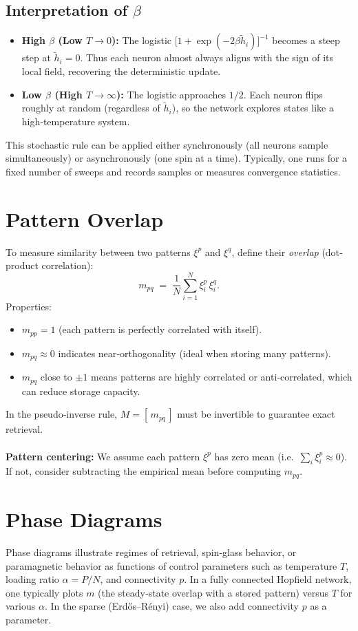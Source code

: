 \documentclass{article}
\begin{document}
\subsection{Interpretation of $\beta$}
\begin{itemize}
    \item \textbf{High $\beta$ (Low $T\to 0$):}  The logistic $\bigl[1+\exp(-2\beta\tilde{h}_i)\bigr]^{-1}$ becomes a steep step at $\tilde{h}_i=0$.  Thus each neuron almost always aligns with the sign of its local field, recovering the deterministic update.
    \item \textbf{Low $\beta$ (High $T\to\infty$):}  The logistic approaches $1/2$.  Each neuron flips roughly at random (regardless of $\tilde{h}_i$), so the network explores states like a high‐temperature system.
\end{itemize}
This stochastic rule can be applied either synchronously (all neurons sample simultaneously) or asynchronously (one spin at a time).  Typically, one runs for a fixed number of sweeps and records samples or measures convergence statistics.

\section{Pattern Overlap}
To measure similarity between two patterns $\xi^p$ and $\xi^q$, define their \emph{overlap} (dot‐product correlation):
\[
m_{pq}
\;=\;
\frac{1}{N}\sum_{i=1}^{N} \xi_i^p \,\xi_i^q.
\]
Properties:
\begin{itemize}
    \item $m_{pp} = 1$ (each pattern is perfectly correlated with itself).
    \item $m_{pq}\approx 0$ indicates near‐orthogonality (ideal when storing many patterns).
    \item $m_{pq}$ close to $\pm 1$ means patterns are highly correlated or anti‐correlated, which can reduce storage capacity.
\end{itemize}
In the pseudo‐inverse rule, $M = [\,m_{pq}\,]$ must be invertible to guarantee exact retrieval.
\\\\
\textbf{Pattern centering:}  We assume each pattern $\xi^p$ has zero mean (i.e.\ $\sum_i \xi_i^p \approx 0$).  If not, consider subtracting the empirical mean before computing $m_{pq}$.  
\section{Phase Diagrams}
Phase diagrams illustrate regimes of retrieval, spin‐glass behavior, or paramagnetic behavior as functions of control parameters such as temperature $T$, loading ratio $\alpha = P/N$, and connectivity $p$.  In a fully connected Hopfield network, one typically plots $m$ (the steady‐state overlap with a stored pattern) versus $T$ for various $\alpha$.  In the sparse (Erdős–Rényi) case, we also add connectivity $p$ as a parameter.
\end{document}
